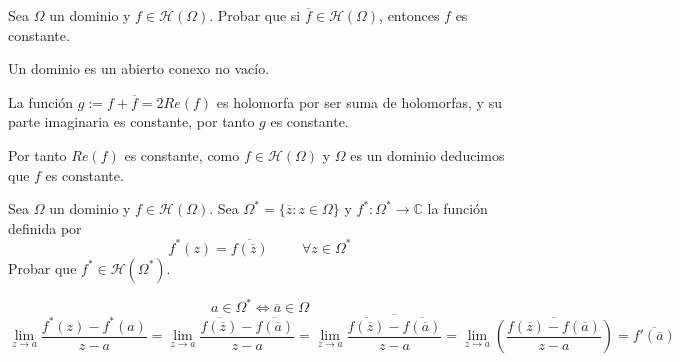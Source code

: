 \begin{ejer}
	Sea $\Omega$ un dominio y $f\in\mathcal{H}(\Omega)$. Probar que si $\overline{f}\in\mathcal{H}(\Omega)$, entonces $f$ es constante.
\end{ejer}


\begin{sol}
	
Un dominio es un abierto conexo no vacío.

La función $g := f+\overline{f} = 2Re(f)$ es holomorfa por ser suma de holomorfas, y su parte imaginaria es constante, por tanto $g$ es constante.

Por tanto $Re(f)$ es constante, como $f\in\mathcal{H}(\Omega)$ y $ \Omega$ es un dominio deducimos que $f$ es constante.
\end{sol}





\begin{ejer}
	Sea $\Omega$ un dominio y $f\in\mathcal{H}(\Omega)$. Sea $\Omega^{\ast} = \{ \overline{z} : z\in\Omega \}$ y $f^{\ast}:\Omega^{\ast} \rightarrow \mathbb{C}$ la función definida por
	$$ f^{\ast}(z) = \overline{ f(\overline{z} ) } \hspace{1cm} \forall z\in\Omega^{\ast}$$
	Probar que $f^{\ast}\in\mathcal{H}(\Omega^{\ast})$.
\end{ejer}

\begin{sol}
	
\begin{comment}
Tenemos que 
$P(z) = a_n z^n + a_{n-1}z^{n-1}+...+a_1z + a_0$, 
$P(\overline{z}) = a_n \overline{z}^n + a_{n-1}\overline{z}^{n-1}+...+a_1\overline{z} + a_0 $

$\overline{ P(\overline{z}) } = \overline{a_n}z^n + \overline{a_{n-1}}z^{n-1}+...+\overline{a_1}z + \overline{a_0}$

$\overline{z}^n = \overline{z} ... \overline{z} = \overline{(z^n)}$

resolvemos
\end{comment}
$$a\in\Omega^{\ast} \Longleftrightarrow \overline{a}\in\Omega$$
$$\lim_{z\rightarrow a} \frac{f^{\ast}(z)-f^{\ast}(a)}{z-a} = \lim_{z\rightarrow a} \frac{\overline{f(\overline{z})} - \overline{f(\overline{a})}}{z-a} =
\lim_{z\rightarrow a} \frac{\overline{\overline{f(\overline{z})} - \overline{f(\overline{a})}}}{z-a} =
\lim_{z\rightarrow a} \overline{\left( \frac{f(\overline{z})-f(\overline{a})}{z-a} \right)} =
 \overline{f'(\overline{a})}$$
\end{sol}




